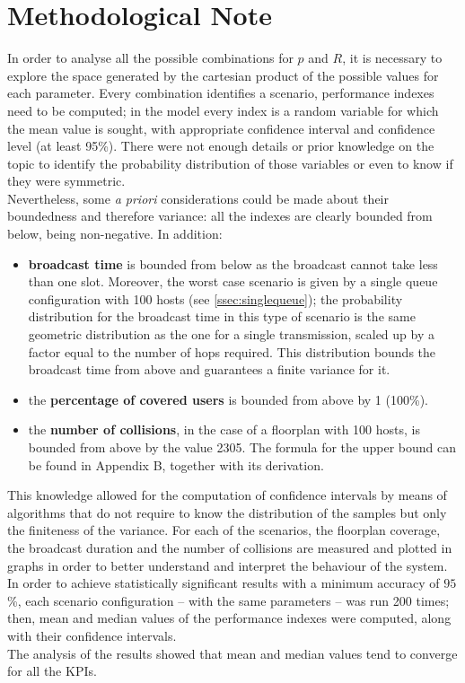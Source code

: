\section*{Methodological Note}\label{Methodological}
In order to analyse all the possible combinations for $p$ and $R$, it is necessary to explore the space
generated by the cartesian product of the possible values for each parameter. Every combination 
identifies a scenario, performance indexes need to be computed; in the model
every index is a random variable for which the mean value is sought, with appropriate confidence interval
and confidence level (at least 95\%). 
There were not enough details or prior knowledge on the topic to identify the probability distribution of those variables or even to know if they were symmetric.\\
Nevertheless, some \textit{a priori} considerations could be made about their boundedness and therefore variance: all the indexes are clearly bounded from below, being non-negative. In addition:
\begin{itemize}
    \item \textbf{broadcast time} is bounded from below as the broadcast cannot take less than one slot. Moreover, the worst case scenario is given by a single queue configuration with 100 hosts (see \ref{ssec:singlequeue}); the probability distribution for the broadcast time in this type of scenario is the same geometric distribution as the one for a single transmission, scaled up by a factor equal to the number of hops required. This distribution bounds the broadcast time from above and guarantees a finite variance for it.
    \item the \textbf{percentage of covered users} is bounded from above by 1 (100\%).
    \item the \textbf{number of collisions}, in the case of a floorplan with 100 hosts, is bounded from above by the value 2305. The formula for the upper bound can be found in Appendix B, together with its derivation.
\end{itemize} 
This knowledge allowed for the computation of confidence intervals by means of algorithms that do not require to know the distribution of the
samples but only the finiteness of the variance.
\hfill \break
For each of the scenarios, the floorplan coverage, the
broadcast duration and the number of collisions are measured and plotted in graphs in order to 
better understand and interpret the behaviour of the system.\\
In order to achieve statistically significant results with a minimum accuracy of
$95$\%, each scenario configuration -- with the same parameters -- was run 200 times; then, mean and median values of the performance
indexes were computed, along with their confidence intervals. \\
The analysis of the results showed that mean and median values tend to converge for all the KPIs.
